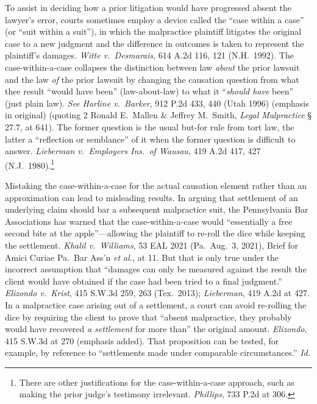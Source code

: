 \documentclass[
  12pt,
  letterpaper,
]{scrartcl}
\begin{document}
To assist in deciding how a prior litigation would have progressed absent the
lawyer's error, courts sometimes employ a device called the ``case within a
case'' (or ``suit within a suit''), in which the malpractice plaintiff
litigates the original case to a new judgment and the difference in outcomes is
taken to represent the plaintiff's damages. \textit{Witte v.~Desmarais}, 614
A.2d 116, 121 (N.H.~1992). The case-within-a-case collapses the distinction
between law \textit{about} the prior lawsuit and the law \textit{of} the prior
lawsuit by changing the causation question from what thee result ``would have
been'' (law-about-law) to what it ``\textit{should have} been'' (just plain
law). \textit{See} \textit{Harline v.~Barker}, 912 P.2d 433, 440 (Utah 1996)
(emphasis in original) (quoting 2 Ronald E.~Mallen \& Jeffrey M.~Smith,
\textit{Legal Malpractice} § 27.7, at 641). The former question is the usual
but-for rule from tort law, the latter a ``reflection or semblance'' of it when
the former question is difficult to answer. \textit{Lieberman v.~Employers
Ins.~of Wausau}, 419 A.2d 417, 427 (N.J.~1980).\footnote{There are other
justifications for the case-within-a-case approach, such as making the prior
judge's testimony irrelevant. \textit{Phillips}, 733 P.2d at 306.}

Mistaking the case-within-a-case for the actual causation element rather than an
approximation can lead to misleading results. In arguing that settlement of an underlying
claim should bar a subsequent malpractice suit, the Pennsylvania Bar
Associations has warned that the case-within-a-case would ``essentially a free
second bite at the apple''---allowing the plaintiff to re-roll the dice while
keeping the settlement. \textit{Khalil v.~Williams}, 53 EAL 2021 (Pa.~Aug.~3,
2021), Brief for Amici Curiae Pa.~Bar Ass'n \textit{et al.}, at 11. But that is
only true under the incorrect assumption that ``damages can only be measured
against the result the client would have obtained if the case had been tried to
a final judgment.'' \textit{Elizondo v.~Krist}, 415 S.W.3d 259, 263
(Tex.~2013); \textit{Lieberman}, 419 A.2d at 427. In a malpractice case arising
out of a settlement, a court can avoid re-rolling the dice by requiring the
client to prove that ``absent malpractice, they probably would have recovered
\emph{a settlement} for more than'' the original amount. \textit{Elizondo}, 415
S.W.3d at 270 (emphasis added). That proposition can be tested, for example, by
reference to ``settlements made under comparable circumstances.'' \textit{Id.}
\end{document}
